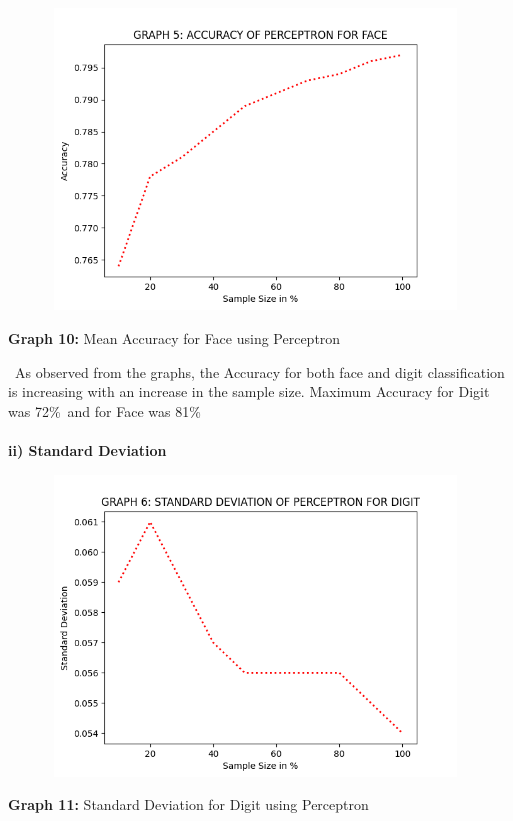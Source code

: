 \documentclass[10 pt]{report}   	%
\begin{document}
{\begin{center}
\end{center}
\begin{figure} [H]
\includegraphics [width = 11cm, height = 8cm]{PERC_ACC_FACE.png}
\end {figure}
\begin{center}
\small \textbf {Graph 10:} Mean Accuracy for Face using Perceptron\\
\end{center}
\textbullet\ As observed from the graphs, the Accuracy for both face and digit classification is increasing with an increase in the sample size. Maximum Accuracy for Digit was 72\%\ and for Face was 81\%\ \\  \\
\textbf{ii) Standard Deviation}
\begin{figure} [H]
\includegraphics [width = 11cm, height = 8cm]{PERC_STD_DIGIT.png}
\end {figure}
\begin{center}
\small \textbf {Graph 11:} Standard Deviation for Digit using Perceptron\\

\end{center}}
\end{document}
